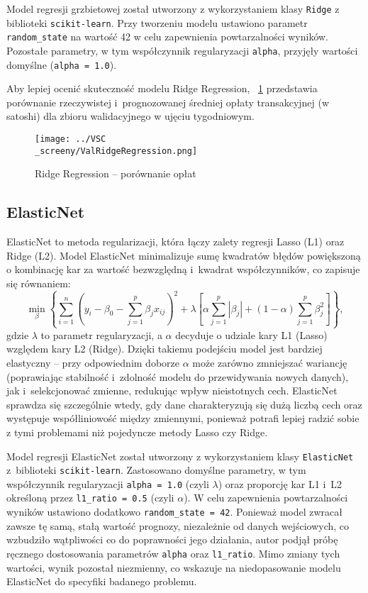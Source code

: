 \documentclass[12pt,a4paper]{report}
\theoremstyle{definition} %
\begin{document}
	Model regresji grzbietowej został utworzony z wykorzystaniem klasy \texttt{Ridge} z biblioteki \texttt{scikit-learn}. Przy tworzeniu modelu ustawiono parametr \texttt{random\_state} na wartość 42 w celu zapewnienia powtarzalności wyników. Pozostałe parametry, w tym współczynnik regularyzacji \texttt{alpha}, przyjęły wartości domyślne (\texttt{alpha = 1.0}).	

	Aby lepiej ocenić skuteczność modelu Ridge Regression, \figurename~\ref{fig:wykresRidgeRegression} przedstawia porównanie rzeczywistej i~prognozowanej średniej opłaty transakcyjnej (w satoshi) dla zbioru walidacyjnego w ujęciu tygodniowym.	

	\begin{figure}[H]
	    \centering
	    \texttt{[image: ../VSC\\\_screeny/ValRidgeRegression.png]} 
	    \caption{Ridge Regression – porównanie opłat}
	    \label{fig:wykresRidgeRegression}
	\end{figure}
	
	\subsection{ElasticNet}
	\hspace*{\parindent}ElasticNet to metoda regularizacji, która łączy zalety regresji Lasso (L1) oraz Ridge (L2). Model ElasticNet minimalizuje sumę kwadratów błędów powiększoną o kombinację kar za wartość bezwzględną i~kwadrat współczynników, co zapisuje się równaniem:
	\[
	\min_{\beta} \left\{ \sum_{i=1}^{n}\left(y_i - \beta_0 - \sum_{j=1}^{p}\beta_j x_{ij}\right)^2 + \lambda \left[\alpha \sum_{j=1}^{p} \left|\beta_j\right| + (1-\alpha) \sum_{j=1}^{p} \beta_j^2 \right] \right\},
	\]
	gdzie $\lambda$ to parametr regularyzacji, a $\alpha$ decyduje o udziale kary L1 (Lasso) względem kary L2 (Ridge). Dzięki takiemu podejściu model jest bardziej elastyczny – przy odpowiednim doborze $\alpha$ może zarówno zmniejszać wariancję (poprawiając stabilność i~zdolność modelu do przewidywania nowych danych), jak i~selekcjonować 			zmienne, redukując wpływ nieistotnych cech. ElasticNet sprawdza się szczególnie wtedy, gdy dane charakteryzują się dużą liczbą cech oraz występuje współliniowość między zmiennymi, ponieważ potrafi lepiej radzić sobie z tymi problemami niż pojedyncze metody Lasso czy Ridge.

	Model regresji ElasticNet został utworzony z wykorzystaniem klasy \texttt{ElasticNet} z~biblioteki \texttt{scikit-learn}. Zastosowano domyślne parametry, w tym współczynnik regularyzacji \texttt{alpha = 1.0} (czyli $\lambda$) oraz proporcję kar L1 i~L2 określoną przez \texttt{l1\_ratio = 0.5} (czyli $\alpha$). W celu zapewnienia powtarzalności wyników ustawiono dodatkowo \texttt{random\_state = 42}. Ponieważ model zwracał zawsze tę samą, stałą wartość prognozy, niezależnie od danych wejściowych, co wzbudziło wątpliwości co do poprawności jego działania, autor podjął próbę ręcznego dostosowania parametrów \texttt{alpha} oraz \texttt{l1\_ratio}. Mimo zmiany tych wartości, wynik pozostał niezmienny, co wskazuje na niedopasowanie modelu ElasticNet do specyfiki badanego problemu.
\end{document}
